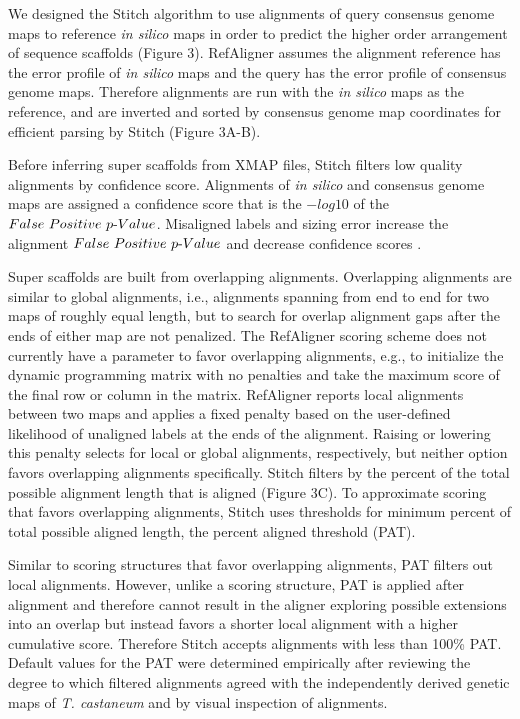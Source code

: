 \documentclass{bmcart}
\begin{document}
We designed the Stitch algorithm to use alignments of query consensus genome maps to reference \textit{in silico} maps in order to predict the higher order arrangement of sequence scaffolds  (Figure 3). RefAligner assumes the alignment reference has the error profile of \textit{in silico} maps and the query has the error profile of consensus genome maps. Therefore alignments are run with the \textit{in silico} maps as the reference, and are inverted and sorted by consensus genome map coordinates for efficient parsing by Stitch (Figure 3A-B). 


Before inferring super scaffolds from XMAP files, Stitch filters low quality alignments by confidence score. Alignments of \textit{in silico} and consensus genome maps are assigned a confidence score that is the $-log10$ of the $False\textnormal{ }Positive\textnormal{ }p\textnormal{-}Value$. Misaligned labels and sizing error increase the alignment $False\textnormal{ }Positive\textnormal{ }p\textnormal{-}Value$ and decrease confidence scores \cite{ProbFP}.


Super scaffolds are built from overlapping alignments. Overlapping alignments are similar to global alignments, i.e., alignments spanning from end to end for two maps of roughly equal length, but to search for overlap alignment gaps after the ends of either map are not penalized. The RefAligner scoring scheme does not currently have a parameter to favor overlapping alignments, e.g., to initialize the dynamic programming matrix with no penalties and take the maximum score of the final row or column in the matrix. RefAligner reports local alignments between two maps and applies a fixed penalty based on the user-defined likelihood of unaligned labels at the ends of the alignment. Raising or lowering this penalty selects for local or global alignments, respectively, but neither option favors overlapping alignments specifically. Stitch filters by the percent of the total possible alignment length that is aligned (Figure 3C). To approximate scoring that favors overlapping alignments, Stitch uses thresholds for minimum percent of total possible aligned length, the percent aligned threshold (PAT). 


Similar to scoring structures that favor overlapping alignments, PAT filters out local alignments. However, unlike a scoring structure, PAT is applied after alignment and therefore cannot result in the aligner exploring possible extensions into an overlap but instead favors a shorter local alignment with a higher cumulative score. Therefore Stitch accepts alignments with less than 100\% PAT. Default values for the PAT were determined empirically after reviewing the degree to which filtered alignments agreed with the independently derived genetic maps of \textit{T. castaneum} and by visual inspection of alignments.
\end{document}
